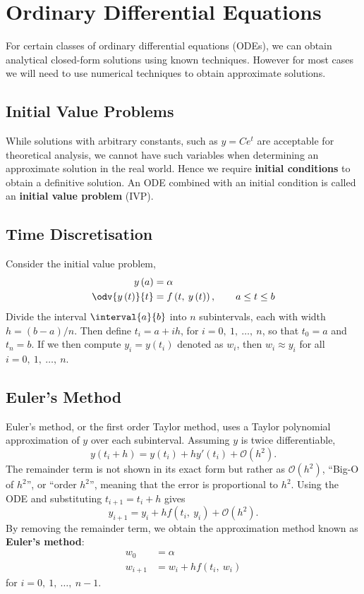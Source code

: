 \documentclass{article}
\begin{document}
\section{Ordinary Differential Equations}
For certain classes of ordinary differential equations (ODEs), we can
obtain analytical closed-form solutions using known techniques. However
for most cases we will need to use numerical techniques to obtain
approximate solutions.
\subsection{Initial Value Problems}
While solutions with arbitrary constants, such as \(y = C e^{t}\) are
acceptable for theoretical analysis, we cannot have such variables when
determining an approximate solution in the real world. Hence we require
\textbf{initial conditions} to obtain a definitive solution. An ODE
combined with an initial condition is called an \textbf{initial value
problem} (IVP).
\subsection{Time Discretisation}
Consider the initial value problem,
\begin{align*}
    y\left( a \right)          & = \alpha                                                              \\
    \odv{y\left( t \right)}{t} & = f\left( t,\: y\left( t \right) \right), \quad \quad a \leq t \leq b
\end{align*}
Divide the interval \(\interval{a}{b}\) into \(n\) subintervals, each
with width \(h = \left( b - a \right) / n\). Then define
\(t_i = a + i h\), for \(i = 0,\: 1,\: \ldots,\: n\), so that
\(t_0 = a\) and \(t_n = b\). If we then compute
\(y_i = y\left( t_i \right)\) denoted as \(w_i\), then
\(w_i \approx y_i\) for all \(i = 0,\: 1,\: \ldots,\: n\).
\subsection{Euler's Method}
Euler's method, or the first order Taylor method, uses a Taylor
polynomial approximation of \(y\) over each subinterval. Assuming \(y\)
is twice differentiable,
\begin{equation*}
    y\left( t_i + h \right) = y\left( t_i \right) + h y'\left( t_i \right) + \mathcal{O}\left( h^2 \right).
\end{equation*}
The remainder term is not shown in its exact form but rather as
\(\mathcal{O}\left( h^2 \right)\), ``Big-O of \(h^2\)'', or
``order \(h^2\)'', meaning that the error is proportional to \(h^2\).
Using the ODE and substituting \(t_{i + 1} = t_i + h\) gives
\begin{equation*}
    y_{i + 1} = y_i + h f\left( t_i,\: y_i \right) + \mathcal{O}\left( h^2 \right).
\end{equation*}
By removing the remainder term, we obtain the approximation method known
as \textbf{Euler's method}:
\begin{align*}
    w_0       & = \alpha                             \\
    w_{i + 1} & = w_i + h f\left( t_i,\: w_i \right)
\end{align*}
for \(i = 0,\: 1,\: \ldots,\: n - 1\).
\end{document}
